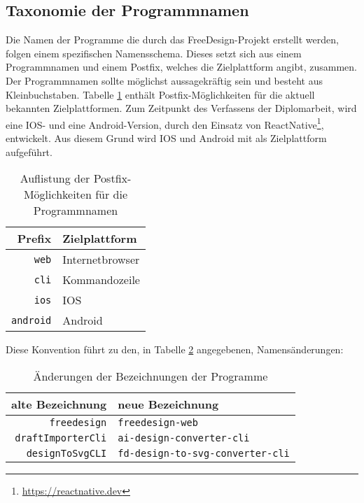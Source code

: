 \subsection{Taxonomie der Programmnamen}
Die Namen der Programme die durch das FreeDesign-Projekt erstellt werden, folgen einem spezifischen Namensschema. Dieses setzt sich aus einem Programmnamen und einem Postfix, welches die Zielplattform angibt, zusammen. Der Programmnamen sollte möglichst aussagekräftig sein und besteht aus Kleinbuchstaben. Tabelle \ref{table:postfix} enthält Postfix-Möglichkeiten für die aktuell bekannten Zielplattformen.
Zum Zeitpunkt des Verfassens der Diplomarbeit, wird eine IOS- und eine Android-Version, durch den Einsatz von ReactNative\footnote{\url{https://reactnative.dev}}, entwickelt. Aus diesem Grund wird IOS und  Android mit als Zielplattform aufgeführt. 
\begin{table}[H]
    \centering
    \caption{Auflistung der Postfix-Möglichkeiten für die Programmnamen}
    \label{table:postfix}
    \begin{tabular}{r|l}
        \textbf{Prefix} & \textbf{Zielplattform} \\
        \hline
        \lstinline|web| & Internetbrowser \\
        \lstinline|cli| & Kommandozeile \\
        \lstinline|ios| & IOS  \\
        \lstinline|android| & Android 
    \end{tabular}
\end{table}

Diese Konvention führt zu den, in Tabelle \ref{table:Programmnamen} angegebenen, Namensänderungen: 
\begin{table}[H]
    \centering
    \caption{Änderungen der Bezeichnungen der Programme}
    \label{table:Programmnamen}
    \begin{tabular}{r|l}
        \textbf{alte Bezeichnung} & \textbf{neue Bezeichnung} \\
        \hline
        \lstinline|freedesign| & \lstinline|freedesign-web| \\
        \lstinline|draftImporterCli| & \lstinline|ai-design-converter-cli| \\
        \lstinline|designToSvgCLI| & \lstinline|fd-design-to-svg-converter-cli| 
    \end{tabular}
\end{table}
